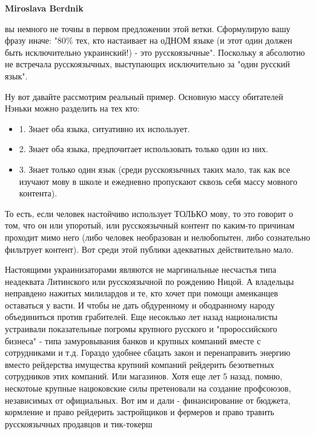 \begin{itemize}
\begin{itemize}
\textbf{Miroslava Berdnik} 

вы немного не точны в первом предложении этой ветки. Сформулирую вашу фразу
иначе: "80\% тех, кто настаивает на оДНОМ языке (и этот один должен быть
исключительно украинский!) - это русскоязычные". Поскольку я абсолютно не
встречала русскоязычных, выступающих исключительно за "один русский язык".

\end{itemize}

 

Ну вот давайте рассмотрим реальный пример. Основную массу обитателей Нэньки можно разделить на тех кто:

\begin{itemize}
  \item 1. Знает оба языка, ситуативно их использует.
  \item 2. Знает оба языка, предпочитает использовать только один из них.
	\item 3. Знает только один язык (среди русскоязычных таких мало, так как все
	изучают мову в школе и ежедневно пропускают сквозь себя массу мовного
	контента).
\end{itemize}

То есть, если человек настойчиво использует ТОЛЬКО мову, то это говорит о том,
что он или упоротый, или русскоязычный контент по каким-то причинам проходит
мимо него (либо человек необразован и нелюбопытен, либо сознательно фильтрует
контент). Вот среди этой публики адекватных действительно мало.

\begin{itemize}
 

Настоящими украинизаторами являются не маргинальные несчастья типа неадеквата
Литинского или русскоязычной по рождению Ницой. А владельцы неправдено нажитых
милилардов и те, кто хочет при помощи амеиканцев оставаться у васти. И чтобы не
дать обдуренному и ободранному народу объединиться против грабителей. Еще
несоклько лет назад националисты устраивали показательные погромы крупного
русского и "пророссийского бизнеса" - типа замуровывания банков и крупных
компаний вместе с сотрудниками и т.д. Гораздо удобнее сбацать закон и
перенаправить энергию вместо рейдерства имущества крупний компаний рейдерить
безответных сотрудников этих компаний. Или магазинов. Хотя еще лет 5 назад,
помню, нескотоые крупные нацюковские силы претеновали на создание профсоюзов,
независимых от официальных. Вот им и дали - финансирование от бюджета,
кормление и право рейдерить застройщиков и фермеров и право травить
русскоязычных продавцов и тик-токерш



\end{itemize}
\end{itemize}
